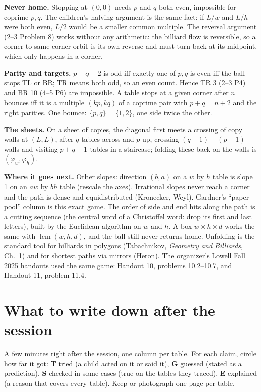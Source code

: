 \documentclass[11pt,letterpaper]{article}
\begin{document}
\textbf{Never home.} Stopping at $(0,0)$ needs $p$ and $q$ both even, impossible for coprime $p,q$. The children's halving argument is the same fact: if $L/w$ and $L/h$ were both even, $L/2$ would be a smaller common multiple. The reversal argument (2--3 Problem 8) works without any arithmetic: the billiard flow is reversible, so a corner-to-same-corner orbit is its own reverse and must turn back at its midpoint, which only happens in a corner.

\textbf{Parity and targets.} $p+q-2$ is odd iff exactly one of $p,q$ is even iff the ball stops TL or BR; TR means both odd, so an even count. Hence TR 3 (2--3 P4) and BR 10 (4--5 P6) are impossible. A table stops at a given corner after $n$ bounces iff it is a multiple $(kp,kq)$ of a coprime pair with $p+q=n+2$ and the right parities. One bounce: $\{p,q\}=\{1,2\}$, one side twice the other.

\textbf{The sheets.} On a sheet of copies, the diagonal first meets a crossing of copy walls at $(L,L)$, after $q$ tables across and $p$ up, crossing $(q-1)+(p-1)$ walls and visiting $p+q-1$ tables in a staircase; folding these back on the walls is $(\varphi_w,\varphi_h)$.

\textbf{Where it goes next.} Other slopes: direction $(b,a)$ on a $w$ by $h$ table is slope 1 on an $aw$ by $bh$ table (rescale the axes). Irrational slopes never reach a corner and the path is dense and equidistributed (Kronecker, Weyl). Gardner's ``paper pool'' column is this exact game. The order of side and end hits along the path is a cutting sequence (the central word of a Christoffel word: drop its first and last letters), built by the Euclidean algorithm on $w$ and $h$. A box $w\times h\times d$ works the same with $\operatorname{lcm}(w,h,d)$, and the ball still never returns home. Unfolding is the standard tool for billiards in polygons (Tabachnikov, \emph{Geometry and Billiards}, Ch.~1) and for shortest paths via mirrors (Heron). The organizer's Lowell Fall 2025 handouts used the same game: Handout 10, problems 10.2--10.7, and Handout 11, problem 11.4.

\clearpage
\section{What to write down after the session}

A few minutes right after the session, one column per table. For each claim, circle how far it got: \textbf{T} tried (a child acted on it or said it), \textbf{G} guessed (stated as a prediction), \textbf{S} checked in some cases (true on the tables they traced), \textbf{E} explained (a reason that covers every table). Keep or photograph one page per table.
\end{document}
